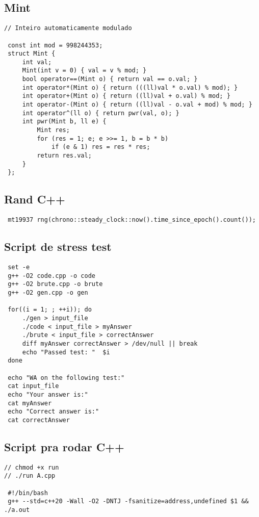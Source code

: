 \documentclass[11pt, a4paper, twoside]{article}
\begin{document}
\subsection{Mint}
\begin{lstlisting}
// Inteiro automaticamente modulado

 const int mod = 998244353;
 struct Mint {
     int val;
     Mint(int v = 0) { val = v % mod; }
     bool operator==(Mint o) { return val == o.val; }
     int operator*(Mint o) { return (((ll)val * o.val) % mod); }
     int operator+(Mint o) { return ((ll)val + o.val) % mod; }
     int operator-(Mint o) { return ((ll)val - o.val + mod) % mod; }
     int operator^(ll o) { return pwr(val, o); }
     int pwr(Mint b, ll e) {
         Mint res;
         for (res = 1; e; e >>= 1, b = b * b)
             if (e & 1) res = res * res;
         return res.val;
     }
 };
\end{lstlisting}

\subsection{Rand C++}
\begin{lstlisting}
 mt19937 rng(chrono::steady_clock::now().time_since_epoch().count());
\end{lstlisting}

\subsection{Script de stress test}
\begin{lstlisting}
 set -e
 g++ -O2 code.cpp -o code
 g++ -O2 brute.cpp -o brute
 g++ -O2 gen.cpp -o gen
 
 for((i = 1; ; ++i)); do
     ./gen > input_file
     ./code < input_file > myAnswer
     ./brute < input_file > correctAnswer
     diff myAnswer correctAnswer > /dev/null || break
     echo "Passed test: "  $i
 done
 
 echo "WA on the following test:"
 cat input_file
 echo "Your answer is:"
 cat myAnswer
 echo "Correct answer is:"
 cat correctAnswer
\end{lstlisting}

\subsection{Script pra rodar C++}
\begin{lstlisting}
// chmod +x run
// ./run A.cpp

 #!/bin/bash
 g++ --std=c++20 -Wall -O2 -DNTJ -fsanitize=address,undefined $1 && ./a.out
\end{lstlisting}
\end{document}
